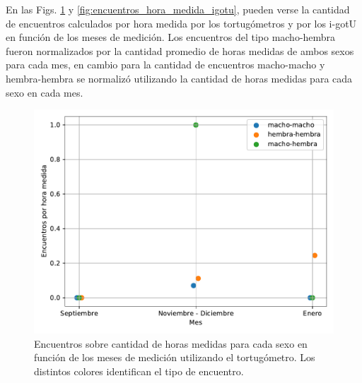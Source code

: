 En las Figs. \ref{fig:encuentros_hora_medida_tortugometro} y \ref{fig:encuentros_hora_medida_igotu}, pueden verse la cantidad de encuentros calculados por hora medida por los tortugómetros y por los i-gotU en función de los meses de medición. Los encuentros del tipo macho-hembra fueron normalizados por la cantidad promedio de horas medidas de ambos sexos para cada mes, en cambio para la cantidad de encuentros macho-macho y hembra-hembra se normalizó utilizando la cantidad de horas medidas para cada sexo en cada mes.  
\begin{figure}[ht]
    \begin{center}
       
   
    \includegraphics[width=\imsize]{Chap2/encuentros_por_hora_tortugometro.pdf}
\end{center}
    \caption[Encuentros por hora medida tomando los datos del tortugómetro.]{Encuentros sobre cantidad de horas medidas para cada sexo en función de los meses de medición utilizando el tortugómetro. Los distintos colores identifican el tipo de encuentro.}
    \label{fig:encuentros_hora_medida_tortugometro}
\end{figure}
 
